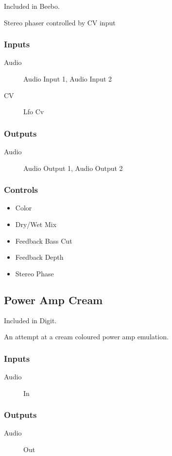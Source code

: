 Included in Beebo.

Stereo phaser controlled by CV input



\subsubsection{Inputs}
\begin{description}
\item [Audio] Audio Input 1, Audio Input 2
\item [CV] Lfo Cv
\end{description}

\subsubsection{Outputs}
\begin{description}
\item [Audio] Audio Output 1, Audio Output 2
\end{description}

\subsubsection{Controls}
\begin{itemize}
\item Color
\item Dry/Wet Mix
\item Feedback Bass Cut
\item Feedback Depth
\item Stereo Phase
\end{itemize}

\subsection{Power Amp Cream}

Included in Digit.

An attempt at a cream coloured power amp emulation.



\subsubsection{Inputs}
\begin{description}
\item [Audio] In
\end{description}

\subsubsection{Outputs}
\begin{description}
\item [Audio] Out
\end{description}

